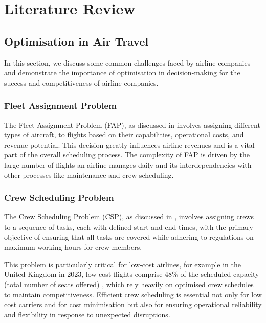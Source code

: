 \chapter{Literature Review}
\label{Chapter2}


\section{Optimisation in Air Travel}

In this section, we discuss some common challenges faced by airline companies and demonstrate the importance of optimisation in decision-making for the success and competitiveness of airline companies.

\subsection{Fleet Assignment Problem}


The Fleet Assignment Problem (FAP), as discussed in \cite{airline_fleet_assignement} involves assigning different types of aircraft, to flights based on their capabilities, operational costs, and revenue potential. This decision greatly influences airline revenues and is a vital part of the overall scheduling process. The complexity of FAP is driven by the large number of flights an airline manages daily and its interdependencies with other processes like maintenance and crew scheduling.


\subsection{Crew Scheduling Problem} %

The Crew Scheduling Problem (CSP), as discussed in \cite{crew_scheduling_problem}, involves assigning crews to a sequence of tasks, each with defined start and end times, with the primary objective of ensuring that all tasks are covered while adhering to regulations on maximum working hours for crew members.

This problem is particularly critical for low-cost airlines, for example in the United Kingdom in 2023, low-cost flights comprise 48\% of the scheduled capacity (total number of seats offered) \cite{lcc_new_norm}, which rely heavily on optimised crew schedules to maintain competitiveness. Efficient crew scheduling is essential not only for low cost carriers and for cost minimisation but also for ensuring operational reliability and flexibility in response to unexpected disruptions.  \cite{ryanair_youtube_report}


